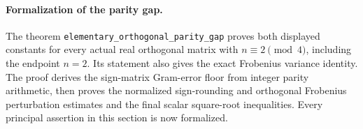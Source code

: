 \paragraph{Formalization of the parity gap.} The theorem \texttt{elementary\_\allowbreak orthogonal\_\allowbreak parity\_\allowbreak gap} proves both displayed constants for every actual real orthogonal matrix with $n\equiv2\pmod4$, including the endpoint $n=2$. Its statement also gives the exact Frobenius variance identity. The proof derives the sign-matrix Gram-error floor from integer parity arithmetic, then proves the normalized sign-rounding and orthogonal Frobenius perturbation estimates and the final scalar square-root inequalities. Every principal assertion in this section is now formalized.
